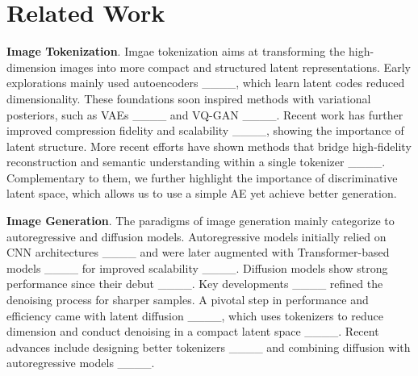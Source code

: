 \section{Related Work}
\label{sec:related}


\textbf{Image Tokenization}. 
Imgae tokenization aims at transforming the high-dimension images into more compact and structured latent representations. 
Early explorations mainly used autoencoders ____, which learn latent codes reduced dimensionality. 
These foundations soon inspired methods with variational posteriors,
such as VAEs ____ and VQ-GAN ____. 
Recent work has further improved compression fidelity and scalability ____, showing the importance of latent structure.
More recent efforts have shown methods that bridge high-fidelity reconstruction and semantic understanding within a single tokenizer ____. 
Complementary to them, we further highlight the importance of discriminative latent space, which allows us to use a simple AE yet achieve better generation. 



\textbf{Image Generation}.  
The paradigms of image generation 
mainly categorize to autoregressive and diffusion models.
Autoregressive models initially relied on CNN architectures ____ and were later augmented with Transformer-based models ____ for improved scalability ____. 
Diffusion models show strong performance since their debut ____. 
Key developments ____ refined the denoising process for sharper samples. 
A pivotal step in performance and efficiency came with latent diffusion ____, which uses tokenizers to reduce dimension and conduct denoising in a compact latent space ____. 
Recent advances include designing better tokenizers ____
and combining diffusion with autoregressive models ____. 

